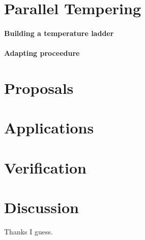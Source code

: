 \documentclass[reprint, amsmath,amssymb, aps, nofootinbib, superscriptaddress]{revtex4}
\begin{document}
%
%
%
%
%
%
\section{Parallel Tempering\label{sec:pt}}

\paragraph{Building a temperature ladder}

\paragraph{Adapting proceedure}


%
%
%
%
%
%
\section{Proposals\label{sec:prop}}


%
%
%
%
%
%
\section{Applications\label{sec:app}}



%
%
%
%
%
%
\section{Verification\label{sec:ver}}





%
%
%
%
%
%
\section{Discussion
\label{sec:conclusions}}



\begin{acknowledgments}
Thanks I guess.
\end{acknowledgments}


\end{document}
